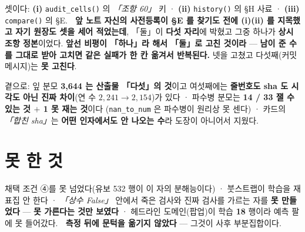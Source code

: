 \documentclass[10pt]{article}
\begin{document}
셋이다: \textbf{(i)} \texttt{audit\_cells()} 의 \emph{「조항 60」} 키 ·
\textbf{(ii)} \texttt{history()} 의 \S H 사료 · \textbf{(iii)} \texttt{compare()} 의 \S E.
🔴 \textbf{앞 노트 자신의 사전등록이 \S E 를 찾기도 전에 (i)(ii) 를 지목했고 자기 원장도 셋을
세어 적었는데}, 「둘」이 \textbf{다섯 자리}에 박혔고 그중 하나가 \textbf{상시 조항 정본}이었다.
\textbf{앞선 비평이 「하나」라 해서 「둘」로 고친 것이라} ---
\textbf{남이 준 수를 그대로 받아 고치면 같은 실패가 한 칸 옮겨서 반복된다.}
넷을 고쳤고 다섯째(커밋 메시지)는 \textbf{못 고친다}.

곁으로: 잎 분모 \textbf{3{,}644 는 산출물 「다섯」의 것}이고 여섯째에는
\textbf{줄번호도 sha 도 시각도 아닌 진짜 차이}(연 수 $2{,}241 \to 2{,}154$)가 있다 ·
파수병 분모는 \textbf{14 / 33 잴 수 있는 것 $+$ 1 못 재는 것}이다
(\texttt{nan\_to\_num} 은 파수병이 원리상 못 센다) ·
카드의 \emph{「합친 sha」}는 \textbf{어떤 인자에서도 안 나오는 수}라 도장이 아니어서 지웠다.

\section{못 한 것}

채택 조건 ④를 못 넘었다(유보 532 행이 이 자의 분해능이다) ·
붓스트랩이 학습을 재표집 안 한다 ·
\emph{「상수 False」} 안에서 죽은 검사와 진짜 검사를 가르는 자를 \textbf{못 만들었다}
--- \textbf{못 가른다는 것만 보였다} ·
헤드라인 도메인(팝업)이 학습 \textbf{18} 행이라 예측 팔에 못 들어갔다.
🔴 \textbf{측정 뒤에 문턱을 옮기지 않았다} --- 그것이 사후 부분집합이다.
\end{document}
